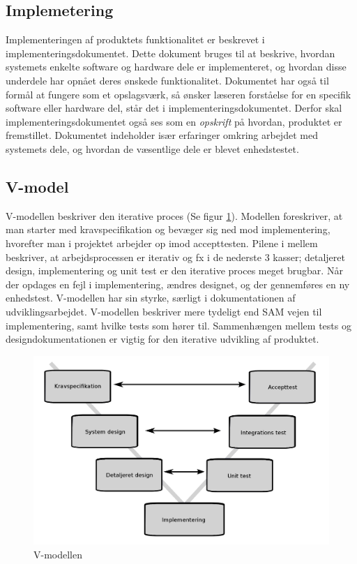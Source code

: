 	\subsection{Implemetering} \label{title:implementering}
	Implementeringen af produktets funktionalitet er beskrevet i implementeringsdokumentet. Dette dokument bruges til at beskrive, hvordan systemets enkelte software og hardware dele er implementeret, og hvordan disse underdele har opnået deres ønskede funktionalitet. Dokumentet har også til formål at fungere som et opslagsværk, så ønsker læseren forståelse for en specifik software eller hardware del, står det i implementeringsdokumentet. Derfor skal implementeringsdokumentet også ses som en \textit{opskrift} på hvordan, produktet er fremstillet. Dokumentet indeholder især erfaringer omkring arbejdet med systemets dele, og hvordan de væsentlige dele er blevet enhedstestet. 

\subsection{V-model}
V-modellen beskriver den iterative proces (Se figur \ref{fig:vmodel}). Modellen foreskriver, at man starter med kravspecifikation og bevæger sig ned mod implementering, hvorefter man i projektet arbejder op imod accepttesten. Pilene i mellem beskriver, at arbejdsprocessen er iterativ og fx i de nederste 3 kasser; detaljeret design, implementering og unit test er den iterative proces meget brugbar. Når der opdages en fejl i implementering, ændres designet, og der gennemføres en ny enhedstest.  V-modellen har sin styrke, særligt i dokumentationen af udviklingsarbejdet. V-modellen beskriver mere tydeligt end SAM vejen til implementering, samt hvilke tests som hører til. Sammenhængen mellem tests og designdokumentationen er vigtig for den iterative udvikling af produktet.
\begin{figure}[H]
	\includegraphics[width = \textwidth]{billeder/Vmodel.png}
	\caption{V-modellen}\label{fig:vmodel}
\end{figure}

